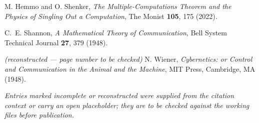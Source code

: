 \documentclass[11pt,a4paper]{article}
\theoremstyle{ffgft}
\begin{document}
\begin{description}[leftmargin=3.2em,style=sameline,itemsep=0.3em]
\item[{[B10]}] M. Hemmo and O. Shenker, \emph{The Multiple-Computations Theorem
and the Physics of Singling Out a Computation}, The Monist \textbf{105}, 175
(2022).

\item[{[B11]}] C.~E. Shannon, \emph{A Mathematical Theory of Communication}, Bell
System Technical Journal \textbf{27}, 379 (1948).

\item[{[B12]}] \emph{(reconstructed --- page number to be checked)} N. Wiener,
\emph{Cybernetics: or Control and Communication in the Animal and the Machine},
MIT Press, Cambridge, MA (1948).

\end{description}
\endgroup

\vspace{1em}
\noindent
{\small\itshape Entries marked \emph{incomplete} or \emph{reconstructed} were
supplied from the citation context or carry an open placeholder; they are to be
checked against the working files before publication.}
\end{document}
